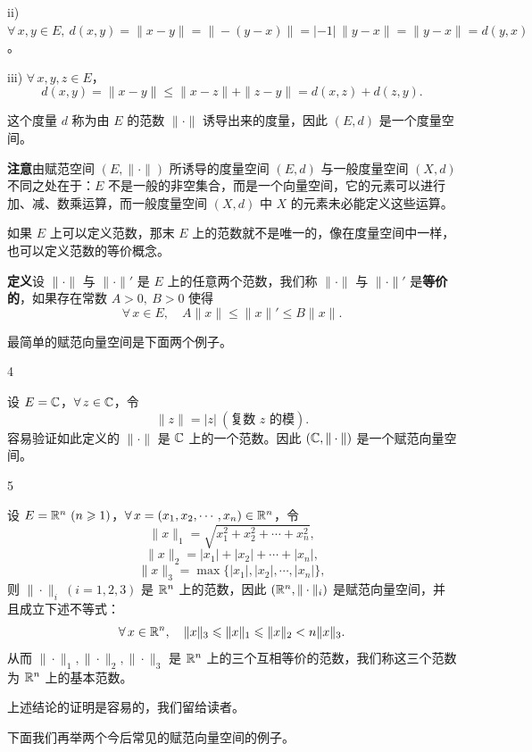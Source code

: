 ii) $\forall\,x,y\in E,\ d(x,y)=\|x-y\|=\|-(y-x)\|=|-1|\,\|y-x\|=\|y-x\|=d(y,x)$。

iii) $\forall\,x,y,z\in E$，
\[d(x,y)=\|x-y\|\leqslant\|x-z\|+\|z-y\|=d(x,z)+d(z,y).\]

这个度量 $d$ 称为由 $E$ 的范数 $\|\cdot\|$ 诱导出来的度量，因此 $(E,d)$ 是一个度量空间。

\textbf{注意}\quad 由赋范空间 $(E,\|\cdot\|)$ 所诱导的度量空间 $(E,d)$ 与一般度量空间 $(X,d)$ 不同之处在于：$E$ 不是一般的非空集合，而是一个向量空间，它的元素可以进行加、减、数乘运算，而一般度量空间 $(X,d)$ 中 $X$ 的元素未必能定义这些运算。

如果 $E$ 上可以定义范数，那末 $E$ 上的范数就不是唯一的，像在度量空间中一样，也可以定义范数的等价概念。

\textbf{定义}\quad 设 $\|\cdot\|$ 与 $\|\cdot\|'$ 是 $E$ 上的任意两个范数，我们称 $\|\cdot\|$ 与 $\|\cdot\|'$ 是\textbf{等价的}，如果存在常数 $A>0,\ B>0$ 使得
\[\forall\,x\in E,\quad A\|x\|\leqslant\|x\|'\leqslant B\|x\|.\]

最简单的赋范向量空间是下面两个例子。

\begin{sourceexample}{4}

设 $E=\mathbb{C}$，$\forall\,z\in\mathbb{C}$，令
\[\|z\|=|z|\ (\text{复数 }z\text{ 的模}).\]
容易验证如此定义的 $\|\cdot\|$ 是 $\mathbb{C}$ 上的一个范数。因此 $(\mathbb{C},\|\cdot\|)$ 是一个赋范向量空间。

\end{sourceexample}

\begin{sourceexample}{5}

设 $E=\mathbb{R}^n\ (n\geqslant1)$，$\forall\,x=(x_1,x_2,\cdots,x_n)\in\mathbb{R}^n$，令
\[\|x\|_1=\sqrt{x_1^2+x_2^2+\cdots+x_n^2},\]
\[\|x\|_2=|x_1|+|x_2|+\cdots+|x_n|,\]
\[\|x\|_3=\max\{|x_1|,|x_2|,\cdots,|x_n|\},\]
则 $\|\cdot\|_i\ (i=1,2,3)$ 是 $\mathbb{R}^n$ 上的范数，因此 $(\mathbb{R}^n,\|\cdot\|_i)$ 是赋范向量空间，并且成立下述不等式：
\[\forall\,x\in\mathbb{R}^n,\quad\|x\|_3\leqslant\|x\|_1\leqslant\|x\|_2<n\|x\|_3.\]
从而 $\|\cdot\|_1,\|\cdot\|_2,\|\cdot\|_3$ 是 $\mathbb{R}^n$ 上的三个互相等价的范数，我们称这三个范数为 $\mathbb{R}^n$ 上的基本范数。

上述结论的证明是容易的，我们留给读者。

\end{sourceexample}

下面我们再举两个今后常见的赋范向量空间的例子。

